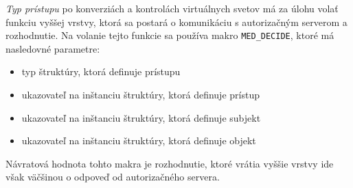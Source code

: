 \textit{Typ prístupu} po konverziách a kontrolách virtuálnych svetov má za úlohu volať funkciu vyššej vrstvy, ktorá sa postará o komunikáciu s autorizačným serverom a rozhodnutie. Na volanie tejto funkcie sa používa makro \texttt{MED\_DECIDE}, ktoré má nasledovné parametre:
\begin{itemize}
\item typ štruktúry, ktorá definuje prístupu
\item ukazovateľ na inštanciu štruktúry, ktorá definuje prístup
\item ukazovateľ na inštanciu štruktúry, ktorá definuje subjekt
\item ukazovateľ na inštanciu štruktúry, ktorá definuje objekt
\end{itemize}
Návratová hodnota tohto makra je rozhodnutie, ktoré vrátia vyššie vrstvy ide však väčšinou o odpoveď od autorizačného servera.
